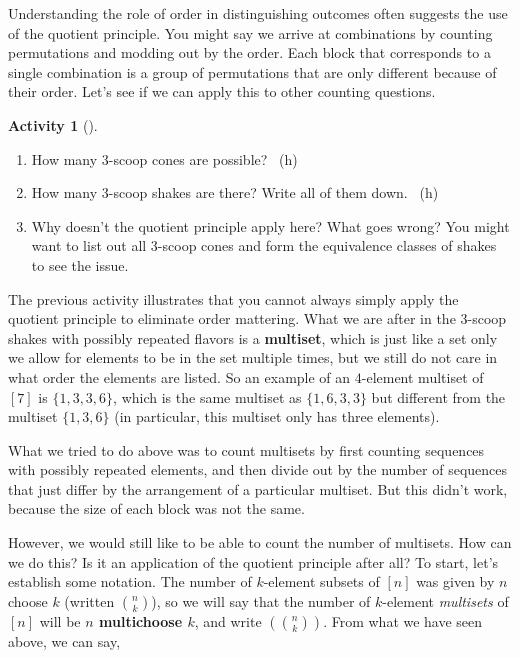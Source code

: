\documentclass[10pt,]{book}
\newcommand{\terminology}[1]{\textbf{#1}}
\theoremstyle{plain}
\theoremstyle{definition}
\theoremstyle{definition}
\theoremstyle{definition}
\newtheorem{activity}[project]{Activity}
\numberwithin{equation}{chapter}
\newcommand{\mchoose}[2]{\left(\!\binom{#1}{#2}\!\right)}
\begin{document}
\hypertarget{p-800}{}%
Understanding the role of order in distinguishing outcomes often suggests the use of the quotient principle.  You might say we arrive at combinations by counting permutations and modding out by the order.  Each block that corresponds to a single combination is a group of permutations that are only different because of their order.  Let's see if we can apply this to other counting questions.%
\begin{activity}[]\label{activity-112}
\begin{enumerate}[font=\bfseries,label=(\alph*),ref=\alph*]
\item\label{task-150} \hypertarget{p-801}{}%
How many 3-scoop cones are possible?%
~{\tiny (h)}\item\label{task-151} \hypertarget{p-803}{}%
How many 3-scoop shakes are there?  Write all of them down.%
~{\tiny (h)}\item\label{task-152} \hypertarget{p-805}{}%
Why doesn't the quotient principle apply here?  What goes wrong?  You might want to list out all 3-scoop cones and form the equivalence classes of shakes to see the issue.%
\end{enumerate}
\end{activity}
\hypertarget{p-806}{}%
The previous activity illustrates that you cannot always simply apply the quotient principle to eliminate order mattering.  What we are after in the 3-scoop shakes with possibly repeated flavors is a \terminology{multiset}, which is just like a set only we allow for elements to be in the set multiple times, but we still do not care in what order the elements are listed.  So an example of an \(4\)-element multiset of \([7]\) is \(\{1,3,3,6\}\), which is the same multiset as \(\{1,6,3,3\}\) but different from the multiset \(\{1,3,6\}\) (in particular, this multiset only has three elements).%
\par
\hypertarget{p-807}{}%
What we tried to do above was to count multisets by first counting sequences with possibly repeated elements, and then divide out by the number of sequences that just differ by the arrangement of a particular multiset.  But this didn't work, because the size of each block was not the same.%
\par
\hypertarget{p-808}{}%
However, we would still like to be able to count the number of multisets.  How can we do this?  Is it an application of the quotient principle after all?  To start, let's establish some notation.  The number of \(k\)-element subsets of \([n]\) was given by \(n\) choose \(k\) (written \(\binom{n}{k}\)), so we will say that the number of \(k\)-element \emph{multisets} of \([n]\) will be \terminology{\(n\) multichoose \(k\)}, and write \(\mchoose{n}{k}\).  From what we have seen above, we can say,%
\end{document}
